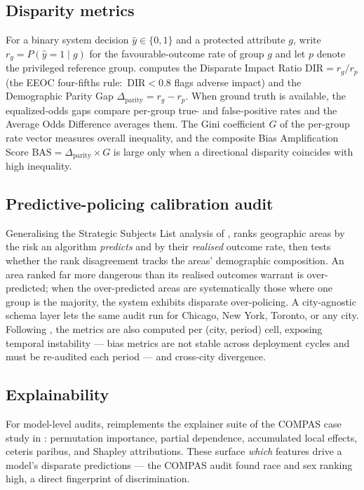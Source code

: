 \documentclass[article,shortnames,nojss]{jss}
\begin{document}
\subsection{Disparity metrics}

For a binary system decision $\hat{y}\in\{0,1\}$ and a protected
attribute $g$, write $r_g = P(\hat{y}=1\mid g)$ for the
favourable-outcome rate of group $g$ and let $p$ denote the privileged
reference group.   computes the Disparate Impact Ratio
$\text{DIR} = r_g / r_p$ (the EEOC four-fifths rule:\ $\text{DIR}<0.8$
flags adverse impact) and the Demographic Parity Gap
$\Delta_{\text{parity}} = r_g - r_p$.  When ground truth is available,
the equalized-odds gaps compare per-group true- and false-positive
rates and the Average Odds Difference averages them.  The Gini
coefficient $G$ of the per-group rate vector measures overall
inequality, and the composite Bias Amplification Score
$\text{BAS} = \Delta_{\text{parity}}\times G$
\citep{Barman2026PredictivePolicingBias} is large only when a
directional disparity coincides with high inequality.

\subsection{Predictive-policing calibration audit}

Generalising the Strategic Subjects List analysis of
\citet{Lacherade2021PredPolChicago},  ranks geographic areas by
the risk an algorithm \emph{predicts} and by their \emph{realised}
outcome rate, then tests whether the rank disagreement tracks the
areas' demographic composition.  An area ranked far more dangerous
than its realised outcomes warrant is over-predicted; when the
over-predicted areas are systematically those where one group is the
majority, the system exhibits disparate over-policing.  A
city-agnostic schema layer lets the same audit run for Chicago, New
York, Toronto, or any city.  Following
\citet{Barman2026PredictivePolicingBias}, the metrics are also
computed per (city, period) cell, exposing temporal instability ---
bias metrics are not stable across deployment cycles and must be
re-audited each period --- and cross-city divergence.

\subsection{Explainability}

For model-level audits,  reimplements the explainer suite of the
COMPAS case study in \citet{Biecek2021XAIStories}: permutation
importance, partial dependence, accumulated local effects, ceteris
paribus, and Shapley attributions.  These surface \emph{which}
features drive a model's disparate predictions --- the COMPAS audit
found race and sex ranking high, a direct fingerprint of
discrimination.
\end{document}
